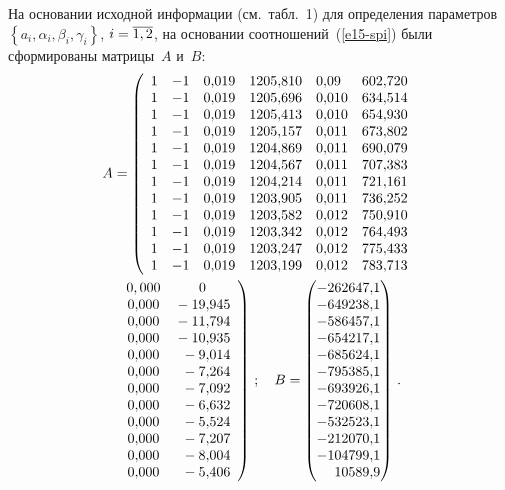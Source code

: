 \begin{multicols}{2}
  На основании исходной информации (см.\ табл.~1) для определения параметров
$\left\{ a_i, \alpha_i, \beta_i, \gamma_i\right\}$, $i\hm=\overline{1,2}$, на
основании соотношений~(\ref{e15-spi}) были сформированы матрицы~$A$
и~$B$:
\begin{multline}
   A=\left(
   \begin{array}{cccccc}
  1 & -1& 0{,}019 & 1205{,}810 & 0{,}09\hphantom{9} & 602{,}720 \\
  1& -1& 0{,}019& 1205{,}696 & 0{,}010& 634{,}514\\
  1& -1& 0{,}019 & 1205{,}413& 0{,}010& 654{,}930\\
  1 &-1& 0{,}019 & 1205{,}157& 0{,}011& 673{,}802\\
  1 &-1& 0{,}019 & 1204{,}869& 0{,}011& 690{,}079\\
  1 &-1& 0{,}019 & 1204{,}567& 0{,}011& 707{,}383\\
  1 &-1& 0{,}019 & 1204{,}214& 0{,}011& 721{,}161\\
  1 &-1& 0{,}019 & 1203{,}905& 0{,}011& 736{,}252\\
  1 &-1& 0{,}019 & 1203{,}582& 0{,}012& 750{,}910\\
  1 &-1& 0{,}019 & 1203{,}342& 0{,}012& 764{,}493\\
  1 &-1& 0{,}019 & 1203{,}247& 0{,}012& 775{,}433\\
  1 &-1& 0{,}019 & 1203{,}199& 0{,}012& 783{,}713
  \end{array}
  \right.\\
  \left.\begin{array}{cc}
   0,000 & 0\\
0{,}000 & {}-19{,}945 \\
0{,}000 & {}-11{,}794 \\
0{,}000 & {}-10{,}935 \\
0{,}000& \hphantom{9}-9{,}014\\
0{,}000&\hphantom{9}-7{,}264\\
0{,}000& \hphantom{9}-7{,}092\\
0{,}000 & \hphantom{9}-6{,}632\\
0{,}000& \hphantom{9}-5{,}524\\
0{,}000 & \hphantom{9}-7{,}207\\
0{,}000& \hphantom{9}-8{,}004\\
0{,}000& \hphantom{9}-5{,}406
   \end{array}
   \right) \,;\quad
  B=\begin{pmatrix}
  -262647{,}1\\
  -649238{,}1\\
  -586457{,}1\\
  -654217{,}1\\
  -685624{,}1\\
  -795385{,}1\\
  -693926{,}1\\
  -720608{,}1\\
  -532523{,}1\\
  -212070{,}1\\
  -104799{,}1\\
  \hphantom{-9}10589{,}9
  \end{pmatrix}\,.
  \label{e16-spi}
  \end{multline}


\end{multicols}
